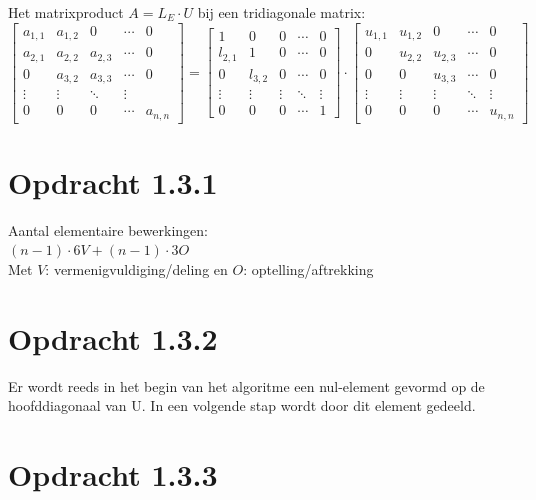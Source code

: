 \documentclass[a4paper]{article}
\begin{document}
 \textbullet { }Het matrixproduct  $A=L_{E}\cdot U$ bij een tridiagonale matrix:
\[
 \begin{bmatrix}
  a_{1,1} & a_{1,2}& 0 & \cdots &0 \\
  a_{2,1} & a_{2,2}&a_{2,3} & \cdots &0 \\
 0 & a_{3,2}&a_{3,3} & \cdots &0 \\
  \vdots  & \vdots  & \ddots & \vdots  \\
 0 & 0 &0 & \cdots & a_{n,n} 
 \end{bmatrix}
=
\begin{bmatrix}
 1 & 0 & 0& \cdots & 0 \\
  l_{2,1} &1 &0& \cdots &0 \\
0 &l_{3,2} &0& \cdots &0 \\
    \vdots  &\vdots  & \vdots  & \ddots & \vdots  \\
0 &0&0 & \cdots & 1 
\end{bmatrix}
\cdot
\begin{bmatrix}
  u_{1,1} & u_{1,2}&0& \cdots &0 \\
  0 & u_{2,2}&u_{2,3} & \cdots &0 \\
  0 & 0&u_{3,3} & \cdots &0 \\
   \vdots  & \vdots  & \vdots  & \ddots & \vdots  \\
 0 & 0 &0& \cdots & u_{n,n}
\end{bmatrix}
\]
%
%
%
%
%
%
\section*{Opdracht 1.3.1}
Aantal elementaire bewerkingen:
\\$(n-1) \cdot 6V + (n-1) \cdot 3O$
\\Met $V$: vermenigvuldiging/deling en $O$: optelling/aftrekking
%
%
%
%
%
%
\section*{Opdracht 1.3.2}
Er wordt reeds in het begin van het algoritme een nul-element gevormd op de hoofddiagonaal van U. In een volgende stap wordt door dit element gedeeld.

%
%
%
%
%
\section*{Opdracht 1.3.3}

%
%
%
%
%
%
\end{document}
